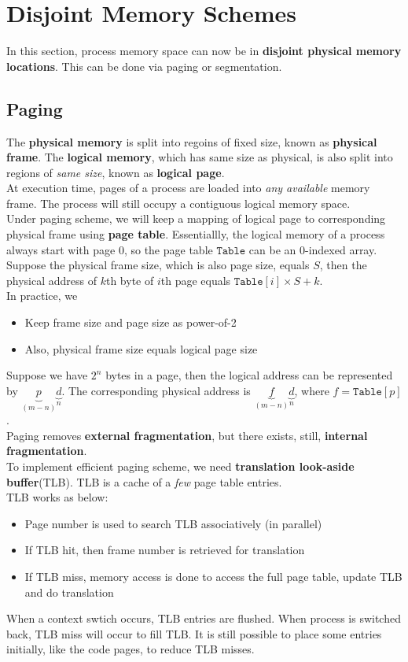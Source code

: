 \documentclass[12pt]{article}
\theoremstyle{definition}
\begin{document}
\section{Disjoint Memory Schemes}
In this section, process memory space can now be in \textbf{disjoint physical memory locations}. This can be done via paging or segmentation.
\subsection{Paging}
The \textbf{physical memory} is split into regoins of fixed size, known as \textbf{physical frame}. The \textbf{logical memory}, which has same size as physical, is also split into regions of \textit{same size}, known as \textbf{logical page}.\\
At execution time, pages of a process are loaded into \textit{any available} memory frame. The process will still occupy a contiguous logical memory space.\\
Under paging scheme, we will keep a mapping of logical page to corresponding physical frame using \textbf{page table}. Essentiallly, the logical memory of a process always start with page $0$, so the page table $\texttt{Table}$ can be an $0$-indexed array.\\
Suppose the physical frame size, which is also page size, equals $S$, then the physical address of $k$th byte of $i$th page equals $\texttt{Table}[i]\times S+k$.\\
In practice, we 
\begin{itemize}
  \item Keep frame size and page size as power-of-2
  \item Also, physical frame size equals logical page size
\end{itemize}
Suppose we have $2^n$ bytes in a page, then the logical address can be represented by $\underbrace{p}_{(m-n)}\underbrace{d}_{n}$. The corresponding physical address is $\underbrace{f}_{(m-n)}\underbrace{d}_{n}$, where $f=\texttt{Table}[p]$.\\

Paging removes \textbf{external fragmentation}, but there exists, still, \textbf{internal fragmentation}.\\

To implement efficient paging scheme, we need \textbf{translation look-aside buffer}(TLB). TLB is a cache of a \textit{few} page table entries.\\
TLB works as below:
\begin{itemize}
  \item Page number is used to search TLB associatively (in parallel)
  \item If TLB hit, then frame number is retrieved for translation
  \item If TLB miss, memory access is done to access the full page table, update TLB and do translation
\end{itemize}
When a context swtich occurs, TLB entries are flushed. When process is switched back, TLB miss will occur to fill TLB. It is still possible to place some entries initially, like the code pages, to reduce TLB misses.\\
\end{document}
